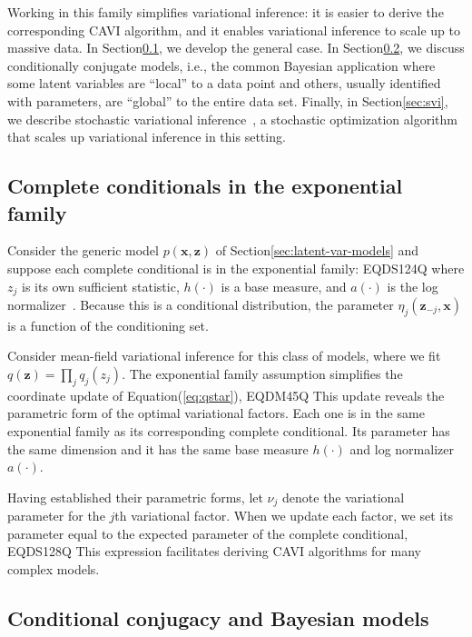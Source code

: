\documentclass{article}
\begin{document}
Working in this family simplifies variational inference: it is easier
to derive the corresponding \gls{CAVI} algorithm, and it enables
variational inference to scale up to massive data.  In
Section\nobreakspace \ref {sec:exp-fam}, we develop the general case.  In
Section\nobreakspace \ref {sec:cond-conj}, we discuss conditionally conjugate models, i.e.,
the common Bayesian application where some latent variables are
``local'' to a data point and others, usually identified with
parameters, are ``global'' to the entire data set.  Finally, in
Section\nobreakspace \ref {sec:svi}, we describe stochastic variational
inference~\citep{Hoffman:2013}, a stochastic optimization algorithm
that scales up variational inference in this setting.

\subsection{Complete conditionals in the exponential family}
\label{sec:exp-fam}

Consider the generic model $p({\mathbf{x}}, {\mathbf{z}})$ of
Section\nobreakspace \ref {sec:latent-var-models} and suppose each complete conditional is
in the exponential family:
EQDS124Q
where $z_j$ is its own sufficient statistic, $h(\cdot)$ is a base
measure, and $a(\cdot)$ is the log normalizer~\citep{Brown:1986}.
Because this is a conditional distribution, the parameter
$\eta_j({\mathbf{z}}_{-j}, {\mathbf{x}})$ is a function of the conditioning set.

Consider mean-field variational inference for this class of models,
where we fit $q({\mathbf{z}}) = \prod_{j} q_j(z_j)$.  The exponential family
assumption simplifies the coordinate update of Equation\nobreakspace \textup {(\ref {eq:qstar})},
EQDM45Q
This update reveals the parametric form of the optimal variational
factors.  Each one is in the same exponential family as its
corresponding complete conditional.  Its parameter has the same
dimension and it has the same base measure $h(\cdot)$ and log
normalizer $a(\cdot)$.

Having established their parametric forms, let $\nu_j$ denote the
variational parameter for the $j$th variational factor.  When we
update each factor, we set its parameter equal to the expected
parameter of the complete conditional,
EQDS128Q
This expression facilitates deriving \gls{CAVI} algorithms for many
complex models.
 \subsection{Conditional conjugacy and Bayesian models}
\label{sec:cond-conj}
\end{document}
